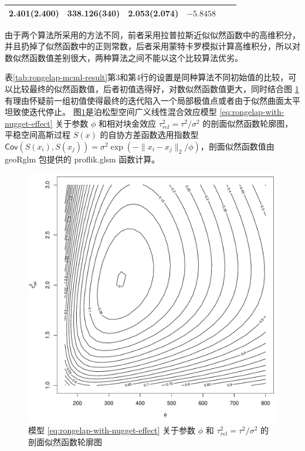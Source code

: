\documentclass[12pt,a4paper,UTF8,twoside]{book}
\theoremstyle{definition}
\theoremstyle{definition}
\theoremstyle{definition}
\theoremstyle{remark}
\begin{document}
\begin{longtable}[]{@{}clllll@{}}
\begin{minipage}[t]{0.15\columnwidth}
2.401(2.400)\strut
\end{minipage} & \begin{minipage}[t]{0.15\columnwidth}\raggedright
338.126(340)\strut
\end{minipage} & \begin{minipage}[t]{0.15\columnwidth}\raggedright
2.053(2.074)\strut
\end{minipage} & \begin{minipage}[t]{0.15\columnwidth}\raggedright
\(-5.8458\)\strut
\end{minipage}\tabularnewline
\bottomrule
\end{longtable}

由于两个算法所采用的方法不同，前者采用拉普拉斯近似似然函数中的高维积分，并且扔掉了似然函数中的正则常数，后者采用蒙特卡罗模拟计算高维积分，所以对数似然函数值差别很大，两种算法之间不能以这个比较算法优劣。

表\ref{tab:rongelap-mcml-result}第3和第4行的设置是同种算法不同初始值的比较，可以比较最终的似然函数值，后者初值选得好，对数似然函数值更大，同时结合图 \ref{fig:profile-phi-tausq} 有理由怀疑前一组初值使得最终的迭代陷入一个局部极值点或者由于似然曲面太平坦致使迭代停止。
\newpage
图\ref{fig:profile-phi-tausq}是泊松型空间广义线性混合效应模型 \eqref{eq:rongelap-with-nugget-effect} 关于参数 \(\phi\) 和相对块金效应 \(\tau^2_{rel} = \tau^2 / \sigma^2\) 的剖面似然函数轮廓图，平稳空间高斯过程 \(S(x)\) 的自协方差函数选用指数型 \(\mathsf{Cov}( S(x_i), S(x_j) ) = \sigma^2 \exp( -\|x_i -x_j\|_{2} / \phi )\)，剖面似然函数值由 geoRglm 包提供的 proflik.glsm 函数计算。

\begin{figure}

{\centering \includegraphics[width=0.65\linewidth]{figures/profile-phitausq} 

}

\caption{模型 \eqref{eq:rongelap-with-nugget-effect} 关于参数 \(\phi\) 和 \(\tau^2_{rel} = \tau^2 / \sigma^2\) 的剖面似然函数轮廓图}\label{fig:profile-phi-tausq}
\end{figure}
\end{document}
